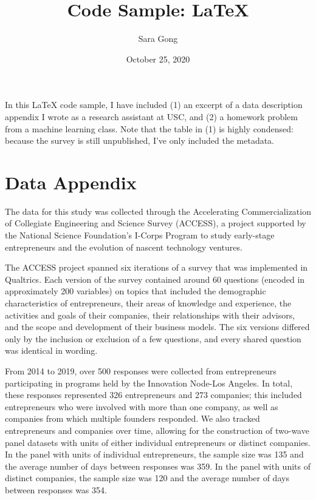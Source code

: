 \documentclass[12pt, letterpaper]{article}
\title{Code Sample: \LaTeX}
\author{Sara Gong}
\date{October 25, 2020}
\begin{document}
\maketitle

In this \LaTeX  \hspace{0.5mm} code sample, I have included (1) an excerpt of a data description appendix I wrote as a research assistant at USC, and (2) a homework problem from a machine learning class. Note that the table in (1) is highly condensed: because the survey is still unpublished, I've only included the metadata.

\section{Data Appendix}
The data for this study was collected through the Accelerating Commercialization of Collegiate Engineering and Science Survey (ACCESS), a project supported by the National Science Foundation's I-Corps Program to study early-stage entrepreneurs and the evolution of nascent technology ventures.

\vspace{5mm}
The ACCESS project spanned six iterations of a survey that was implemented in Qualtrics. Each version of the survey contained around 60 questions (encoded in approximately 200 variables) on topics that included the demographic characteristics of entrepreneurs, their areas of knowledge and experience, the activities and goals of their companies, their relationships with their advisors, and the scope and development of their business models. The six versions differed only by the inclusion or exclusion of a few questions, and every shared question was identical in wording. 

\vspace{5mm}
From 2014 to 2019, over 500 responses were collected from entrepreneurs participating in programs held by the Innovation Node-Los Angeles. In total, these responses represented 326 entrepreneurs and 273 companies; this included entrepreneurs who were involved with more than one company, as well as companies from which multiple founders responded. We also tracked entrepreneurs and companies over time, allowing for the construction of two-wave panel datasets with units of either individual entrepreneurs or distinct companies. In the panel with units of individual entrepreneurs, the sample size was 135 and the average number of days between responses was 359. In the panel with units of distinct companies, the sample size was 120 and the average number of days between responses was 354.
\end{document}
